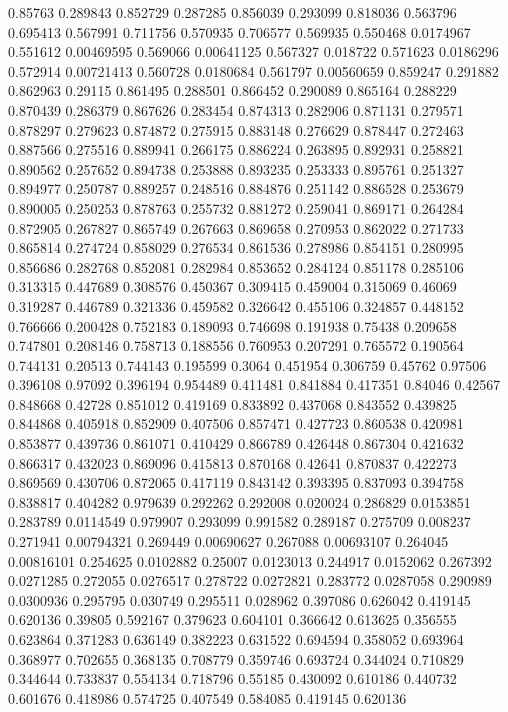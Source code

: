 0.85763 0.289843
0.852729 0.287285
0.856039 0.293099
0.818036 0.563796
0.695413 0.567991
0.711756 0.570935
0.706577 0.569935
0.550468 0.0174967
0.551612 0.00469595
0.569066 0.00641125
0.567327 0.018722
0.571623 0.0186296
0.572914 0.00721413
0.560728 0.0180684
0.561797 0.00560659
0.859247 0.291882
0.862963 0.29115
0.861495 0.288501
0.866452 0.290089
0.865164 0.288229
0.870439 0.286379
0.867626 0.283454
0.874313 0.282906
0.871131 0.279571
0.878297 0.279623
0.874872 0.275915
0.883148 0.276629
0.878447 0.272463
0.887566 0.275516
0.889941 0.266175
0.886224 0.263895
0.892931 0.258821
0.890562 0.257652
0.894738 0.253888
0.893235 0.253333
0.895761 0.251327
0.894977 0.250787
0.889257 0.248516
0.884876 0.251142
0.886528 0.253679
0.890005 0.250253
0.878763 0.255732
0.881272 0.259041
0.869171 0.264284
0.872905 0.267827
0.865749 0.267663
0.869658 0.270953
0.862022 0.271733
0.865814 0.274724
0.858029 0.276534
0.861536 0.278986
0.854151 0.280995
0.856686 0.282768
0.852081 0.282984
0.853652 0.284124
0.851178 0.285106
0.313315 0.447689
0.308576 0.450367
0.309415 0.459004
0.315069 0.46069
0.319287 0.446789
0.321336 0.459582
0.326642 0.455106
0.324857 0.448152
0.766666 0.200428
0.752183 0.189093
0.746698 0.191938
0.75438 0.209658
0.747801 0.208146
0.758713 0.188556
0.760953 0.207291
0.765572 0.190564
0.744131 0.20513
0.744143 0.195599
0.3064 0.451954
0.306759 0.45762
0.97506 0.396108
0.97092 0.396194
0.954489 0.411481
0.841884 0.417351
0.84046 0.42567
0.848668 0.42728
0.851012 0.419169
0.833892 0.437068
0.843552 0.439825
0.844868 0.405918
0.852909 0.407506
0.857471 0.427723
0.860538 0.420981
0.853877 0.439736
0.861071 0.410429
0.866789 0.426448
0.867304 0.421632
0.866317 0.432023
0.869096 0.415813
0.870168 0.42641
0.870837 0.422273
0.869569 0.430706
0.872065 0.417119
0.843142 0.393395
0.837093 0.394758
0.838817 0.404282
0.979639 0.292262
0.292008 0.020024
0.286829 0.0153851
0.283789 0.0114549
0.979907 0.293099
0.991582 0.289187
0.275709 0.008237
0.271941 0.00794321
0.269449 0.00690627
0.267088 0.00693107
0.264045 0.00816101
0.254625 0.0102882
0.25007 0.0123013
0.244917 0.0152062
0.267392 0.0271285
0.272055 0.0276517
0.278722 0.0272821
0.283772 0.0287058
0.290989 0.0300936
0.295795 0.030749
0.295511 0.028962
0.397086 0.626042
0.419145 0.620136
0.39805 0.592167
0.379623 0.604101
0.366642 0.613625
0.356555 0.623864
0.371283 0.636149
0.382223 0.631522
0.694594 0.358052
0.693964 0.368977
0.702655 0.368135
0.708779 0.359746
0.693724 0.344024
0.710829 0.344644
0.733837 0.554134
0.718796 0.55185
0.430092 0.610186
0.440732 0.601676
0.418986 0.574725
0.407549 0.584085
0.419145 0.620136
